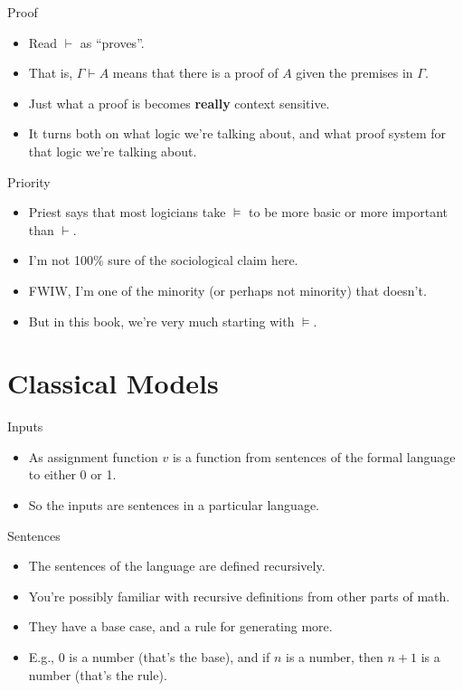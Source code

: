 \documentclass[
  17pt,
  letterpaper,
  ignorenonframetext,
  aspectratio=169,
  handout]{beamer}
\providecommand{\tightlist}{%
  \setlength{\itemsep}{0pt}\setlength{\parskip}{0pt}}\usepackage{longtable,booktabs,array}
\begin{document}
\begin{frame}{Proof}
\protect\hypertarget{proof}{}
\begin{itemize}[<+->]
\tightlist
\item
  Read \(\vdash\) as ``proves''.
\item
  That is, \(\Gamma \vdash A\) means that there is a proof of \(A\)
  given the premises in \(\Gamma\).
\item
  Just what a proof is becomes \textbf{really} context sensitive.
\item
  It turns both on what logic we're talking about, and what proof system
  for that logic we're talking about.
\end{itemize}
\end{frame}

\begin{frame}{Priority}
\protect\hypertarget{priority}{}
\begin{itemize}[<+->]
\tightlist
\item
  Priest says that most logicians take \(\vDash\) to be more basic or
  more important than \(\vdash\).
\item
  I'm not 100\% sure of the sociological claim here.
\item
  FWIW, I'm one of the minority (or perhaps not minority) that doesn't.
\item
  But in this book, we're very much starting with \(\vDash\).
\end{itemize}
\end{frame}

\hypertarget{classical-models}{%
\section{Classical Models}\label{classical-models}}

\begin{frame}{Inputs}
\protect\hypertarget{inputs}{}
\begin{itemize}[<+->]
\tightlist
\item
  As assignment function \(v\) is a function from sentences of the
  formal language to either 0 or 1.
\item
  So the inputs are sentences in a particular language.
\end{itemize}
\end{frame}

\begin{frame}{Sentences}
\protect\hypertarget{sentences}{}
\begin{itemize}[<+->]
\tightlist
\item
  The sentences of the language are defined recursively.
\item
  You're possibly familiar with recursive definitions from other parts
  of math.
\item
  They have a base case, and a rule for generating more.
\item
  E.g., 0 is a number (that's the base), and if \(n\) is a number, then
  \(n+1\) is a number (that's the rule).
\end{itemize}
\end{frame}
\end{document}
